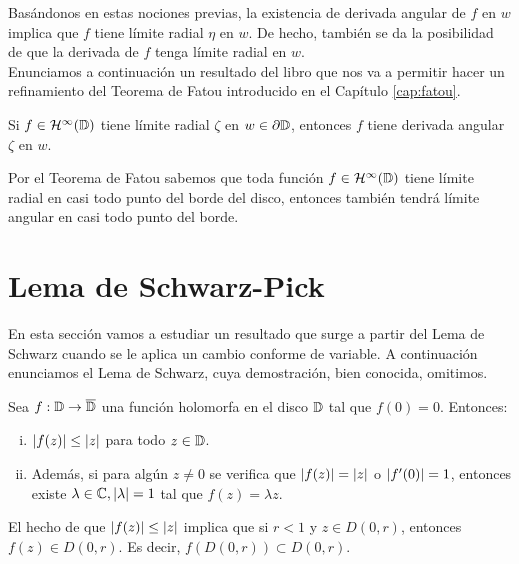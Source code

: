Basándonos en estas nociones previas, la existencia de derivada angular de $f$ en $w$ implica que $f$ tiene límite radial $\eta$ en $w$. De hecho, también se da la posibilidad de que la derivada de $f$ tenga límite radial en $w$. \\

Enunciamos a continuación un resultado del libro \citet[capítulo 13]{conway2} que nos va a permitir hacer un refinamiento del Teorema de Fatou introducido en el Capítulo \ref{cap:fatou}. \\ %

\begin{corollary}
    Si $f \in \mathcal{H}^{\infty}(\mathbb{D})$ tiene límite radial $\zeta$ en $w \in \partial \mathbb{D}$, entonces $f$ tiene derivada angular $\zeta$ en $w$. %
\end{corollary}

Por el Teorema de Fatou sabemos que toda función $f \in \mathcal{H}^{\infty}(\mathbb{D})$ tiene límite radial en casi todo punto del borde del disco, entonces también tendrá límite angular en casi todo punto del borde. \\

\section{Lema de Schwarz-Pick}

En esta sección vamos a estudiar un resultado que surge a partir del Lema de Schwarz cuando se le aplica un cambio conforme de variable. A continuación enunciamos el Lema de Schwarz, cuya demostración, bien conocida, omitimos. \\

\begin{theorem}
    Sea $f: \mathbb{D} \to \overline{\mathbb{D}}$ una función holomorfa en el disco $\mathbb{D}$ tal que $f(0) = 0$. Entonces:
    \begin{enumerate}[(i)]
        \item $\left\lvert f(z)\right\rvert \leq \left\lvert z\right\rvert$ para todo $z \in \mathbb{D}$.
        \item Además, si para algún $z \not = 0$ se verifica que $\left\lvert f(z)\right\rvert = \left\lvert z\right\rvert$ o $\left\lvert f'(0)\right\rvert = 1$, entonces existe $\lambda \in \mathbb{C}, \left\lvert\lambda\right\rvert = 1$ tal que $f(z)=\lambda z$.
    \end{enumerate}
\end{theorem}

\begin{obs}
    El hecho de que $\left\lvert f(z)\right\rvert \leq \left\lvert z\right\rvert$ implica que si $r < 1$ y $z \in D(0,r)$, entonces $f(z) \in D(0,r)$. Es decir, $f(D(0,r)) \subset D(0,r)$. \\
\end{obs}

